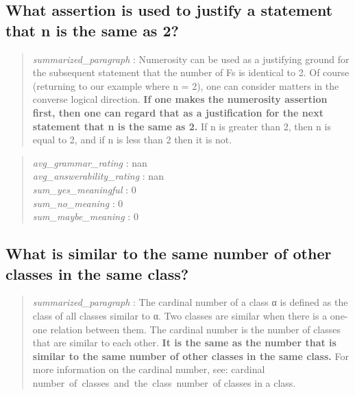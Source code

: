 \hypertarget{what-assertion-is-used-to-justify-a-statement-that-n-is-the-same-as-2}{%
\subsection{What assertion is used to justify a statement that n is the
same as
2?}\label{what-assertion-is-used-to-justify-a-statement-that-n-is-the-same-as-2}}

\begin{quote}
\emph{summarized\_paragraph} : Numerosity can be used as a justifying
ground for the subsequent statement that the number of Fs is identical
to 2. Of course (returning to our example where n = 2), one can consider
matters in the converse logical direction. \textbf{If one makes the
numerosity assertion first, then one can regard that as a justification
for the next statement that n is the same as 2.} If n is greater than 2,
then n is equal to 2, and if n is less than 2 then it is not.
\end{quote}

\begin{quote}
\emph{avg\_grammar\_rating} : nan\\
\emph{avg\_answerability\_rating} : nan\\
\emph{sum\_yes\_meaningful} : 0\\
\emph{sum\_no\_meaning} : 0\\
\emph{sum\_maybe\_meaning} : 0
\end{quote}

\hypertarget{what-is-similar-to-the-same-number-of-other-classes-in-the-same-class}{%
\subsection{What is similar to the same number of other classes in the
same
class?}\label{what-is-similar-to-the-same-number-of-other-classes-in-the-same-class}}

\begin{quote}
\emph{summarized\_paragraph} : The cardinal number of a class α is
defined as the class of all classes similar to α. Two classes are
similar when there is a one-one relation between them. The cardinal
number is the number of classes that are similar to each other.
\textbf{It is the same as the number that is similar to the same number
of other classes in the same class.} For more information on the
cardinal number, see: cardinal number~of~classes~and~the~class~number~of
classes in a class.
\end{quote}

